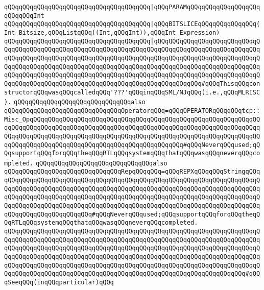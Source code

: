 \verb|qQQqqQQqqQQqqQQqqQQqqQQqqQQqqQQqqQQqqQQq|\verb#|qQQqPARAMqQQqqQQqqQQqqQQqqQQqqQQqqQQqInt#\newline
\verb|qQQqqQQqqQQqqQQqqQQqqQQqqQQqqQQqqQQqqQQq|\verb#|qQQqBITSLICEqQQqqQQqqQQqqQQq(Int_Bitsize,qQQqListqQQq((Int,qQQqInt)),qQQqInt_Expression)#\newline
\verb|qQQqqQQqqQQqqQQqqQQqqQQqqQQqqQQqqQQqqQQq|\verb#|qQQqQQQqQQqqQQqqQQqqQQqqQQqqQQqqQQqqQQqqQQqqQQqqQQqqQQqqQQqqQQqqQQqqQQqqQQqqQQqqQQqqQQqqQQqqQQqqQQqqQQqqQQqqQQqqQQqqQQqqQQqqQQqqQQqqQQqqQQqqQQqqQQqqQQqqQQqqQQqqQQqqQQqqQQqqQQqqQQqqQQqqQQqqQQqqQQqqQQqqQQqqQQqqQQqqQQqqQQqqQQqqQQqqQQqqQQqqQQqqQQqqQQqqQQqqQQqqQQqqQQqqQQqqQQqqQQqqQQqqQQqqQQqqQQqqQQqqQQqqQQqqQQqqQQqqQQqqQQqqQQqqQQqqQQqqQQqqQQqqQQqqQQqqQQqqQQqqQQqqQQq#\verb|#qQQqThisqQQqconstructorqQQqwasqQQqcalledqQQq'???'qQQqinqQQqSML/NJqQQq(i.e.,qQQqMLRISC).|\newline
\newline
\verb|qQQqqQQqqQQqqQQqqQQqqQQqqQQqqQQqalso|\newline
\verb|qQQqqQQqqQQqqQQqqQQqqQQqqQQqqQQqOperatorqQQq=qQQqOPERATORqQQqqQQqtcp::Misc_OpqQQqqQQqqQQqqQQqqQQqqQQqqQQqqQQqqQQqqQQqqQQqqQQqqQQqqQQqqQQqqQQqqQQqqQQqqQQqqQQqqQQqqQQqqQQqqQQqqQQqqQQqqQQqqQQqqQQqqQQqqQQqqQQqqQQqqQQqqQQqqQQqqQQqqQQqqQQqqQQqqQQqqQQqqQQqqQQqqQQqqQQqqQQqqQQqqQQqqQQqqQQqqQQqqQQqqQQqqQQqqQQqqQQqqQQqqQQqqQQqqQQqqQQqqQQq#qQQqNeverqQQqused;qQQqsupportqQQqforqQQqtheqQQqRTLqQQqsystemqQQqthatqQQqwasqQQqneverqQQqcompleted.|\newline
\newline
\verb|qQQqqQQqqQQqqQQqqQQqqQQqqQQqqQQqalso|\newline
\verb|qQQqqQQqqQQqqQQqqQQqqQQqqQQqqQQqRepqQQqqQQq=qQQqREPXqQQqqQQqStringqQQqqQQqqQQqqQQqqQQqqQQqqQQqqQQqqQQqqQQqqQQqqQQqqQQqqQQqqQQqqQQqqQQqqQQqqQQqqQQqqQQqqQQqqQQqqQQqqQQqqQQqqQQqqQQqqQQqqQQqqQQqqQQqqQQqqQQqqQQqqQQqqQQqqQQqqQQqqQQqqQQqqQQqqQQqqQQqqQQqqQQqqQQqqQQqqQQqqQQqqQQqqQQqqQQqqQQqqQQqqQQqqQQqqQQqqQQqqQQqqQQqqQQqqQQqqQQqqQQqqQQqqQQqqQQqqQQqqQQqqQQqqQQqqQQqqQQqqQQqqQQqqQQq#qQQqNeverqQQqused;qQQqsupportqQQqforqQQqtheqQQqRTLqQQqsystemqQQqthatqQQqwasqQQqneverqQQqcompleted.|\newline
\verb|qQQqqQQqqQQqqQQqqQQqqQQqqQQqqQQqqQQqqQQqqQQqqQQqqQQqqQQqqQQqqQQqqQQqqQQqqQQqqQQqqQQqqQQqqQQqqQQqqQQqqQQqqQQqqQQqqQQqqQQqqQQqqQQqqQQqqQQqqQQqqQQqqQQqqQQqqQQqqQQqqQQqqQQqqQQqqQQqqQQqqQQqqQQqqQQqqQQqqQQqqQQqqQQqqQQqqQQqqQQqqQQqqQQqqQQqqQQqqQQqqQQqqQQqqQQqqQQqqQQqqQQqqQQqqQQqqQQqqQQqqQQqqQQqqQQqqQQqqQQqqQQqqQQqqQQqqQQqqQQqqQQqqQQqqQQqqQQqqQQqqQQqqQQqqQQqqQQqqQQqqQQqqQQqqQQqqQQqqQQqqQQqqQQqqQQqqQQqqQQqqQQqqQQqqQQqqQQq#qQQqSeeqQQq(inqQQqparticular)qQQq|\newline
